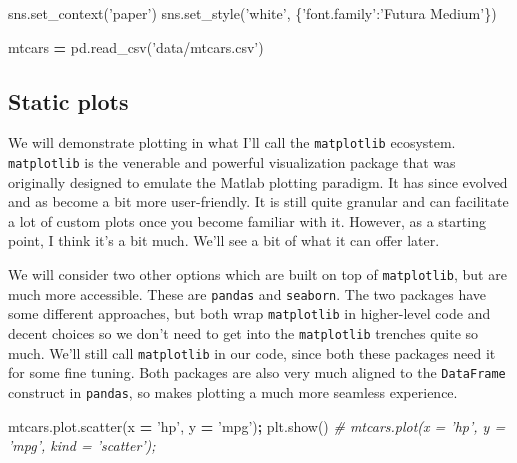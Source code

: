 \documentclass[
  letterpaper,
]{scrbook}
\newenvironment{Shaded}{\begin{snugshade}}{\end{snugshade}}
\newcommand{\CommentTok}[1]{\textcolor[rgb]{0.56,0.35,0.01}{\textit{#1}}}
\newcommand{\NormalTok}[1]{#1}
\newcommand{\OperatorTok}[1]{\textcolor[rgb]{0.81,0.36,0.00}{\textbf{#1}}}
\newcommand{\StringTok}[1]{\textcolor[rgb]{0.31,0.60,0.02}{#1}}
\begin{document}
\begin{Shaded}
\begin{Highlighting}[]
\NormalTok{sns.set_context(}\StringTok{'paper'}\NormalTok{)}
\NormalTok{sns.set_style(}\StringTok{'white'}\NormalTok{, \{}\StringTok{'font.family'}\NormalTok{:}\StringTok{'Futura Medium'}\NormalTok{\})}
\end{Highlighting}
\end{Shaded}

\begin{Shaded}
\begin{Highlighting}[]
\NormalTok{mtcars }\OperatorTok{=}\NormalTok{ pd.read_csv(}\StringTok{'data/mtcars.csv'}\NormalTok{)}
\end{Highlighting}
\end{Shaded}

\hypertarget{static-plots}{%
\subsection{Static plots}\label{static-plots}}

We will demonstrate plotting in what I'll call the \texttt{matplotlib} ecosystem. \texttt{matplotlib} is the venerable and powerful visualization package that was originally designed to emulate the Matlab plotting paradigm. It has since evolved and as become a bit more user-friendly. It is still quite granular and can facilitate a lot of custom plots once you become familiar with it. However, as a starting point, I think it's a bit much. We'll see a bit of what it can offer later.

We will consider two other options which are built on top of \texttt{matplotlib}, but are much more accessible. These are \texttt{pandas} and \texttt{seaborn}. The two packages have some different approaches, but both wrap \texttt{matplotlib} in higher-level code and decent choices so we don't need to get into the \texttt{matplotlib} trenches quite so much. We'll still call \texttt{matplotlib} in our code, since both these packages need it for some fine tuning. Both packages are also very much aligned to the \texttt{DataFrame} construct in \texttt{pandas}, so makes plotting a much more seamless experience.

\begin{Shaded}
\begin{Highlighting}[]
\NormalTok{mtcars.plot.scatter(x }\OperatorTok{=} \StringTok{'hp'}\NormalTok{, y }\OperatorTok{=} \StringTok{'mpg'}\NormalTok{)}\OperatorTok{;}
\NormalTok{plt.show()}
\CommentTok{# mtcars.plot(x = 'hp', y = 'mpg', kind = 'scatter');}
\end{Highlighting}
\end{Shaded}
\end{document}
